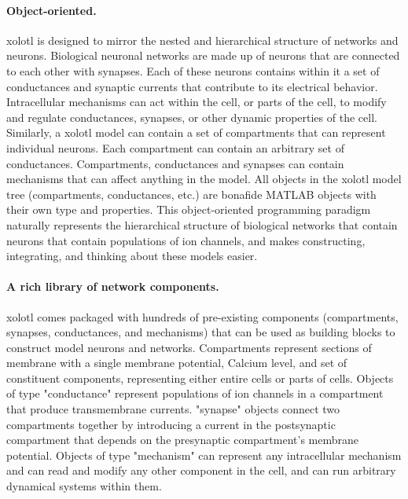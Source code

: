 \documentclass{frontiersSCNS} %
\begin{document}
\paragraph{Object-oriented.}
xolotl is designed to mirror the nested and hierarchical structure of networks and neurons. Biological neuronal networks are made up of neurons that are connected to each other with synapses. Each of these neurons contains within it a set of conductances and synaptic currents that contribute to its electrical behavior. Intracellular mechanisms can act within the cell, or parts of the cell, to modify and regulate conductances, synapses, or other dynamic properties of the cell. Similarly, a xolotl model can contain a set of compartments that can represent individual neurons. Each compartment can contain an arbitrary set of conductances. Compartments, conductances and synapses can contain mechanisms that can affect anything in the model. All objects in the xolotl model tree (compartments, conductances, etc.) are bonafide MATLAB objects with their own type and properties. This object-oriented programming paradigm naturally represents the hierarchical structure of biological networks that contain neurons that contain populations of ion channels, and makes constructing, integrating, and thinking about these models easier.


\paragraph{A rich library of network components.} xolotl comes packaged with hundreds of pre-existing components (compartments, synapses, conductances, and mechanisms) that can be used as building blocks to construct model neurons and networks. Compartments represent sections of membrane with a single membrane potential, Calcium level, and set of constituent components, representing either entire cells or parts of cells. Objects of type "conductance" represent populations of ion channels in a compartment that produce transmembrane currents. "synapse" objects connect two compartments together by introducing a current in the postsynaptic compartment that depends on the presynaptic compartment's membrane potential. Objects of type "mechanism" can represent any intracellular mechanism and can read and modify any other component in the cell, and can run arbitrary dynamical systems within them.
\end{document}
